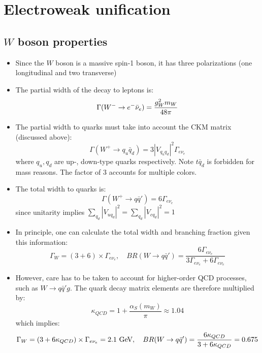 \section{Electroweak unification}

\subsection{$W$ boson properties}
\begin{itemize}
  \item Since the $W$ boson is a massive spin-1 boson, it has three polarizations (one longitudinal and two transverse)
  \item The partial width of the decay to leptons is:
  \begin{equation}
    \Gamma (W^-\rightarrow e^{-} {\bar{\nu}}_e) = \frac{g_W^2 m_W}{48\pi}
  \end{equation}
  \item The partial width to quarks must take into account the CKM matrix (discussed above):
  \begin{equation}
    \Gamma(W^+\rightarrow q_u \bar q_d) = 3|V_{q_u q_d}|^2 \Gamma_{e\nu_e}
  \end{equation}
  where $q_u,q_d$ are up-, down-type quarks respectively. Note $t\bar q_d$ is forbidden for mass reasons. The factor of $3$ accounts for multiple colors.
  \item The total width to quarks is:
  \begin{equation}
    \Gamma(W^+\rightarrow q\bar q') = 6\Gamma_{e\nu_e}
  \end{equation}
  since unitarity implies $\sum_{q_d} |V_{uq_d}|^2 = \sum_{q_d} |V_{cq_d}|^2 = 1$
  \item In principle, one can calculate the total width and branching fraction given this information:
  \begin{equation}
    \Gamma_W = (3+6)\times \Gamma_{e\nu_e}, \quad BR(W\rightarrow q\bar q') = \frac{6\Gamma_{e\nu_e}}{3\Gamma_{e\nu_e}+6\Gamma_{e\nu_e}}
  \end{equation}
  \item However, care has to be taken to account for higher-order QCD processes, such as $W\rightarrow q\bar q' g$. The quark decay matrix elements are therefore multiplied by:
  \begin{equation}
    \kappa_{QCD} = 1 + \frac{\alpha_S(m_W)}{\pi} \approx 1.04
  \end{equation}
  which implies:
  \begin{equation}
    \Gamma_W = (3+6\kappa_{QCD})\times \Gamma_{e\nu_e} = 2.1~\gev, \quad BR(W\rightarrow q\bar q') = \frac{6\kappa_{QCD}}{3+6\kappa_{QCD}} = 0.675

\end{equation}
\end{itemize}
